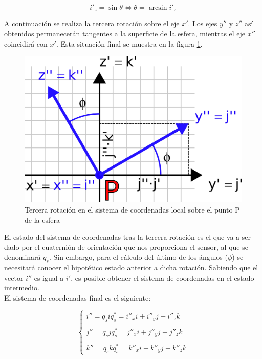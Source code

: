 \documentclass[12pt, a4paper]{report}
\begin{document}
\begin{equation}
i'_z =  \sin \theta \iff \theta = \arcsin i'_z
\end{equation}

A continuación se realiza la tercera rotación sobre el eje $x'$. Los ejes $y''$ y $z''$ así obtenidos permanecerán tangentes a la superficie de la esfera, mientras el eje $x''$ coincidirá con $x'$. Esta situación final se muestra en la figura \ref{fig: esfera_local}.\\

\begin{figure}[h]
	\centering
		\includegraphics[scale=2]{../img/sphere_local.png} 
	\caption{Tercera rotación en el sistema de coordenadas local sobre el punto P de la esfera}
	\label{fig: esfera_local}
\end{figure}

El estado del sistema de coordenadas tras la tercera rotación es el que va a ser dado por el cuaternión de orientación que nos proporciona el sensor, al que se denominará $q_s$. Sin embargo, para el cálculo del último de los ángulos ($\phi$) se necesitará conocer el hipotético estado anterior a dicha rotación. Sabiendo que el vector $i''$ es igual a $i'$, es posible obtener el sistema de coordenadas en el estado intermedio.\\

El sistema de coordenadas final es el siguiente:

$$ \begin{cases}
i'' = q_siq_s^* = i''_x i + i''_y j + i''_z k \\
\\
j'' = q_sjq_s^* = j''_x i + j''_y j + j''_z k \\ 
\\
k'' = q_skq_s^* = k''_x i + k''_y j + k''_z k 
\end{cases}$$
\end{document}
